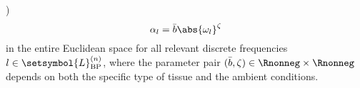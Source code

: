 )
\begin{equation}
  \alpha_{l}
  =
  \bar{b} \abs{ \omega_{l} }^{ \zeta }
 \label{eqn:lin_mod_mech_model_tis_abs_power_law}
\end{equation}
in
the entire Euclidean space for
all relevant discrete frequencies
$l \in \setsymbol{L}_{ \text{BP} }^{(n)}$, where
the parameter pair
$( \bar{b}, \zeta ) \in \Rnonneg \times \Rnonneg$ depends on both
the specific type of
tissue and
the ambient conditions.
